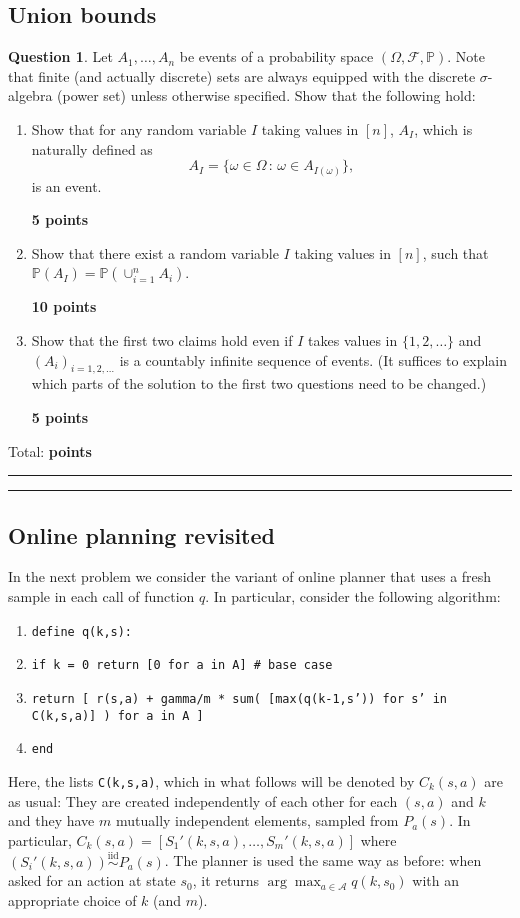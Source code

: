 \documentclass{article}
\DeclareMathOperator*{\1}{\mathbbm{1}}
\newcommand{\bbP}{\mathbb P}
\newcommand{\Prob}[1]{\mathbb{P}( #1 )}
\newcommand{\cF}{\mathcal{F}}
\newcommand{\0}{\mathbf{0}}
\newcounter{DocPoints}
\newcounter{QuestionPoints}
\newcommand{\points}[1]{	\par\mbox{}\par\noindent\hfill {\bf #1 points}	\addtocounter{DocPoints}{#1}
	\addtocounter{QuestionPoints}{#1}
}
\newcommand{\tpoints}[1]{        	\ifthenelse{\isempty{#1}}	{	}	{		\addtocounter{DocPoints}{#1}
		\addtocounter{QuestionPoints}{#1}
	}													 	\par\mbox{}\par\noindent\hfill {Total: \bf \arabic{QuestionPoints}\xspace points}\par\mbox{}\par\hrule\hrule
	\setcounter{QuestionPoints}{0}
}
\theoremstyle{definition}
\newtheorem{question}{Question}
\theoremstyle{remark}
\newcommand{\cA}{\mathcal{A}}
\begin{document}
\subsection*{Union bounds}
\begin{question}
Let $A_1,\dots,A_n$ be events of a probability space $(\Omega,\cF,\bbP)$. Note that finite (and actually discrete) sets are always equipped with the discrete $\sigma$-algebra (power set) unless otherwise specified.
Show that the following hold:
\begin{enumerate}
\item Show that for any random variable $I$ taking values in $[n]$, $A_I$, which is naturally defined as $$A_I = \{ \omega\in \Omega\,:\, \omega \in A_{I(\omega)} \},$$ is an event.
\points{5}
\item Show that there exist a random variable $I$ taking values in $[n]$, such that $\Prob{A_I} = \Prob{\cup_{i=1}^n A_i}$.
\points{10}
\item Show that the first two claims hold even if $I$ takes values in $\{1,2,\dots\}$ and $(A_i)_{i=1,2,\dots}$ is a countably infinite sequence of events. (It suffices to explain which parts of the solution to the first two questions need to be changed.)
\points{5}
\end{enumerate}
\tpoints{}
\end{question}


\subsection*{Online planning revisited}
In the next problem we consider the variant of online planner that uses a fresh sample in each call of function $q$.
In particular, consider the following algorithm:

\begin{enumerate}
\item {\tt define q(k,s):}
\item {\tt if k = 0 return [0 for a in A] \# base case}
\item {\tt return [ r(s,a) + gamma/m * sum( [max(q(k-1,s')) for s' in C(k,s,a)] ) for a in A ]}
\item {\tt end}
\end{enumerate}

Here, the lists {\tt C(k,s,a)}, which in what follows will be denoted by $C_k(s,a)$ are as usual: They are created independently of each other for each $(s,a)$ and $k$ and they have $m$ mutually independent elements, sampled from $P_a(s)$.
In particular, $C_k(s,a) = [S_1'(k,s,a), \dots, S_m'(k,s,a)]$ where $(S_i'(k,s,a))\stackrel{\textrm{iid}}{\sim} P_a(s)$.
The planner is used the same way as before: when asked for an action at state $s_0$, it returns $\arg\max_{a\in \cA} q(k,s_0)$ with an appropriate choice of $k$ (and $m$).
\end{document}
